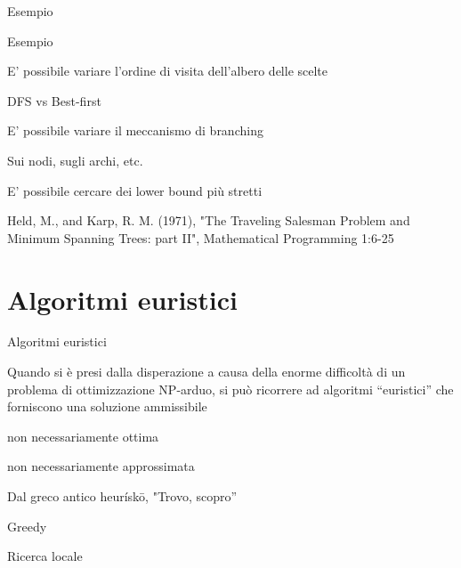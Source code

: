 \begin{frame}{Esempio}


\end{frame}

\begin{frame}{Esempio}


\begin{myboxtitle}
\BIL
\item E' possibile variare l'ordine di visita dell'albero delle scelte
  \BI
  \item DFS vs Best-first
  \EI
\item E' possibile variare il meccanismo di branching
  \BI
  \item Sui nodi, sugli archi, etc.
  \EI
\item E' possibile cercare dei lower bound più stretti 
  \BI
  \item Held, M., and Karp, R. M. (1971), "The Traveling Salesman Problem and Minimum Spanning Trees: part II", Mathematical Programming 1:6-25
  \EI
\EIL
\end{myboxtitle}

\end{frame}



\section{Algoritmi euristici}

\begin{frame}{Algoritmi euristici}

\vspace{-9pt}
\begin{myboxtitle}[Euristiche]
Quando si è presi dalla disperazione a causa della enorme difficoltà di un
problema di ottimizzazione NP-arduo, si può ricorrere ad algoritmi
``euristici'' che forniscono una soluzione ammissibile
\BIL
\item non necessariamente ottima 
\item non necessariamente approssimata 
\EI

Dal greco antico heurískō, "Trovo, scopro”
\end{myboxtitle}

\begin{myboxtitle}
\BI
\item Greedy
\item Ricerca locale
\EI
\end{myboxtitle}
    
\end{frame}

